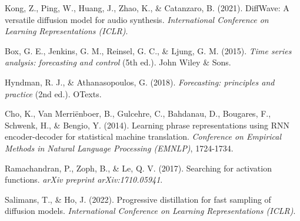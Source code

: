 \documentclass[11pt,a4paper]{article}
\begin{document}
\begin{thebibliography}{99}
Kong, Z., Ping, W., Huang, J., Zhao, K., \& Catanzaro, B. (2021).
DiffWave: A versatile diffusion model for audio synthesis.
\textit{International Conference on Learning Representations (ICLR)}.

Box, G. E., Jenkins, G. M., Reinsel, G. C., \& Ljung, G. M. (2015).
\textit{Time series analysis: forecasting and control} (5th ed.).
John Wiley \& Sons.

Hyndman, R. J., \& Athanasopoulos, G. (2018).
\textit{Forecasting: principles and practice} (2nd ed.).
OTexts.

Cho, K., Van Merriënboer, B., Gulcehre, C., Bahdanau, D., Bougares, F., Schwenk, H., \& Bengio, Y. (2014).
Learning phrase representations using RNN encoder-decoder for statistical machine translation.
\textit{Conference on Empirical Methods in Natural Language Processing (EMNLP)}, 1724-1734.

Ramachandran, P., Zoph, B., \& Le, Q. V. (2017).
Searching for activation functions.
\textit{arXiv preprint arXiv:1710.05941}.

Salimans, T., \& Ho, J. (2022).
Progressive distillation for fast sampling of diffusion models.
\textit{International Conference on Learning Representations (ICLR)}.

\end{thebibliography}
\end{document}
